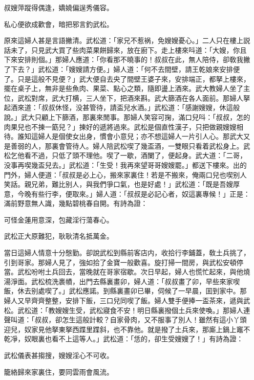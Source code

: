 \begin{myquote}
叔嫂萍蹤得偶逢，嬌嬈偏逞秀儀容。

私心便欲成歡會，暗把邪言釣武松。
\end{myquote}

原來這婦人甚是言語撇清。武松道：「家兄不惹祸，免嫂嫂憂心。」二人只在樓上説話未了，只見武大買了些肉菜果餅歸來，放在廚下。走上樓來呌道：「大嫂，你且下來安排則個。」那婦人應道：「你看那不曉事的！叔叔在此，無人陪侍，卻敎我撇了下去？」武松道：「嫂嫂請方便。」婦人道：「何不去間壁，請王乾娘來安排便了。只是這般不見便？」武大便自去央了間壁王婆子來，安排端正，都拏上樓來，擺在桌子上，無非是些魚肉、果菜、點心之類，隨即盪上酒來。武大教婦人坐了主位，武松對席，武大打横，三人坐下，把酒來斟。武大篩酒在各人面前。那婦人拏起酒來道：「叔叔休怪，没甚管待，請盃兒水酒。」武松道：「感謝嫂嫂，休這般說。」武大只顧上下篩酒，那裏來閒事。那婦人笑容可掬，滿口兒呌：「叔叔，怎的肉果兒也不揀一筯兒？」揀好的遞將過來。武松是個直性漢子，只把做親嫂嫂相待。誰知這婦人是個使女出身，慣會小意兒；亦不想這婦人一片引人心。那武大又是善弱的人，那裏會管待人。婦人陪武松喫了幾盃酒，一雙眼只看着武松身上。武松乞他看不過，只低了頭不理他。喫了一歇，酒闌了，便起身。武大道：「二哥，没事再喫幾盃兒去。」武松道：「生受！我再來望哥哥嫂嫂罷。」都送下樓來。出的門外，婦人便道：「叔叔是必上心，搬來家裏住！若是不搬來，俺兩口兒也喫别人笑話。親兄弟，難比别人，與我們爭口氣，也是好處！」武松道：「既是吾嫂厚意，今晚有些行李，便取來。」婦人道：「叔叔是必記心者，奴這裏專候！」正是：滿前野意無人識，幾點碧桃春自開。有詩為證：

\begin{myquote}
可怪金蓮用意深，包藏淫行蕩春心。

武松正大原難犯，耿耿清名抵萬金。
\end{myquote}

當日這婦人情意十分慇勤。卻說武松到縣前客店内，收拾行李鋪蓋，敎土兵挑了，引到哥家。那婦人見了，強如拾了金寶一般歡喜。旋打掃一間房，與武松安頓停當。武松吩咐土兵回去，當晚就在哥家宿歇。次日早起，婦人也慌忙起來，與他燒湯淨面。武松梳洗裹幘，出門去縣裏畫卯，婦人道：「叔叔畫了卯，早些來家喫飯，休去别處喫了。」武松應諾。到縣裏畫卯已畢，伺候了一早晨，囬到家中。那婦人又早齊齊整整，安排下飯，三口兒同喫了飯。婦人雙手便捧一盃茶來，遞與武松。武松道：「教嫂嫂生受，武松寢食不安！明日縣裏撥個土兵來使喚。」那婦人連聲叫道：「叔叔，卻怎生這般計較？自家骨肉，又不服事了別人！雖然有這小丫頭迎兒，奴家見他拏東拏西蹀里蹀斜，也不靠他。就是撥了土兵來，那廝上鍋上竈不乾凈，奴眼裏也看不上這等人。」武松道：「恁的，卻生受嫂嫂了！」有詩為證：

\begin{myquote}
武松儀表甚搊搜，嫂嫂淫心不可收。

籠絡歸來家裏住，要同雲雨會風流。
\end{myquote}

